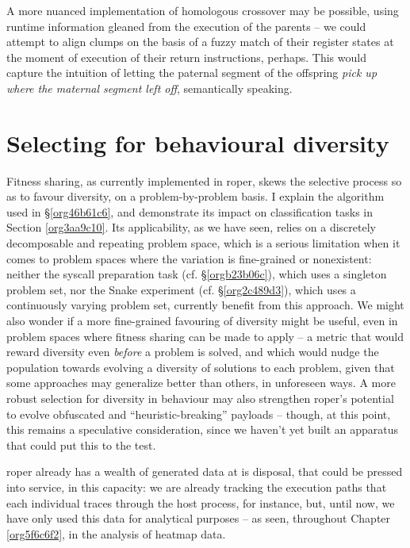 \documentclass[12pt,glossary]{dalthesis}
\begin{document}
A more nuanced implementation of homologous crossover may be possible, using
runtime information gleaned from the execution of the parents -- we could
attempt to align clumps on the basis of a fuzzy match of their register states
at the moment of execution of their return instructions, perhaps. This would
capture the intuition of letting the paternal segment of the offspring \emph{pick up
where the maternal segment left off}, semantically speaking.


\section{Selecting for behavioural diversity}
\label{sec:orgb3caa22}
\label{org824ebdf}

Fitness sharing, as currently implemented in \gls{roper}, skews the selective process
so as to favour diversity, on a problem-by-problem basis. I explain the algorithm
used in \S \ref{org46b61c6}, and demonstrate its impact on classification tasks in 
Section \ref{org3aa9c10}. Its applicability, as we have seen, relies
on a discretely decomposable and repeating problem space, which is a serious limitation
when it comes to problem spaces where the variation is fine-grained or nonexistent:
neither the syscall preparation task (cf. \S \ref{orgb23b06c}), which uses a
singleton problem set, nor the
Snake experiment (cf. \S \ref{org2c489d3}), which uses a continuously
varying problem set, currently benefit from this approach. We might also wonder if
a more fine-grained favouring of diversity might be useful, even in problem spaces
where fitness sharing can be made to apply -- a metric that would reward diversity
even \emph{before} a problem is solved, and which would nudge the population towards
evolving a diversity of solutions to each problem, given that some approaches may
generalize better than others, in unforeseen ways. A more robust selection for
diversity in behaviour may also strengthen \gls{roper}'s potential to evolve 
obfuscated and ``heuristic-breaking'' payloads -- though, at this point, this remains
a speculative consideration, since we haven't yet built an apparatus that could
put this to the test. 

\Gls{roper} already has a wealth of generated data at is disposal, that could be
pressed into service, in this capacity: we are already tracking the execution
paths that each individual traces through the host process, for instance, but,
until now, we have only used this data for analytical purposes -- as seen,
throughout Chapter \ref{org5f6c6f2}, in the analysis of heatmap data. 
\end{document}
